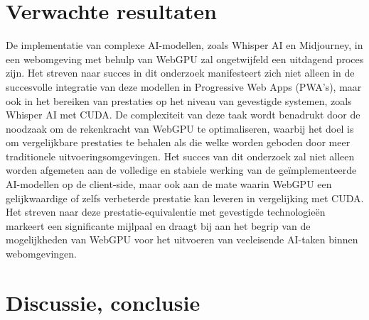 \documentclass{hogent-article}
\begin{document}
\section{Verwachte resultaten}%
\label{sec:verwachte-resultaten}

De implementatie van complexe AI-modellen, zoals Whisper AI en Midjourney, 
in een webomgeving met behulp van WebGPU zal ongetwijfeld een uitdagend proces zijn. 
Het streven naar succes in dit onderzoek manifesteert zich niet alleen in de succesvolle integratie van deze modellen in Progressive Web Apps (PWA's), 
maar ook in het bereiken van prestaties op het niveau van gevestigde systemen, zoals Whisper AI met CUDA. 
De complexiteit van deze taak wordt benadrukt door de noodzaak om de rekenkracht van WebGPU te optimaliseren, 
waarbij het doel is om vergelijkbare prestaties te behalen als die welke worden geboden door meer traditionele uitvoeringsomgevingen. 
Het succes van dit onderzoek zal niet alleen worden afgemeten aan de volledige en stabiele werking van de geïmplementeerde AI-modellen op de client-side, 
maar ook aan de mate waarin WebGPU een gelijkwaardige of zelfs verbeterde prestatie kan leveren in vergelijking met CUDA. 
Het streven naar deze prestatie-equivalentie met gevestigde technologieën markeert een significante mijlpaal 
en draagt bij aan het begrip van de mogelijkheden van WebGPU voor het uitvoeren van veeleisende AI-taken binnen webomgevingen.

\section{Discussie, conclusie}%
\label{sec:discussie-conclusie}



\printbibliography[heading=bibintoc]
\end{document}

